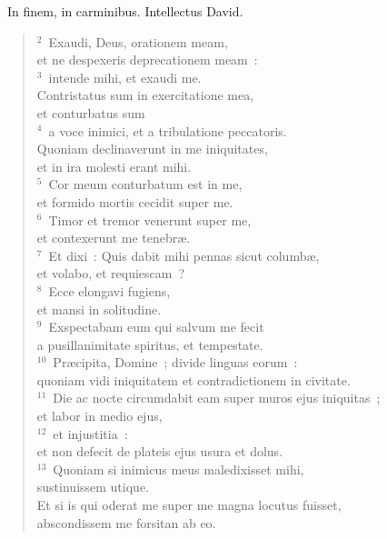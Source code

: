 ~\lettrine[lines=10,image=true,loversize=0.05,lraise=-0.03]{I}{}n finem, in carminibus. Intellectus David.
\begin{flushleft}\begin{verse}\vspace{6pt}${}^{2}$~Exaudi, Deus, orationem meam,\\ et ne despexeris deprecationem meam~:\\
${}^{3}$~intende mihi, et exaudi me.\\ Contristatus sum in exercitatione mea,\\ et conturbatus sum\\
${}^{4}$~a voce inimici, et a tribulatione peccatoris.\\ Quoniam declinaverunt in me iniquitates,\\ et in ira molesti erant mihi.\\
${}^{5}$~Cor meum conturbatum est in me,\\ et formido mortis cecidit super me.\\
${}^{6}$~Timor et tremor venerunt super me,\\ et contexerunt me tenebr\ae .\\
${}^{7}$~Et dixi~: Quis dabit mihi pennas sicut columb\ae ,\\ et volabo, et requiescam~?\\
${}^{8}$~Ecce elongavi fugiens,\\ et mansi in solitudine.\\
${}^{9}$~Exspectabam eum qui salvum me fecit\\ a pusillanimitate spiritus, et tempestate.\\
${}^{10}$~Pr\ae cipita, Domine~; divide linguas eorum~:\\ quoniam vidi iniquitatem et contradictionem in civitate.\\
${}^{11}$~Die ac nocte circumdabit eam super muros ejus iniquitas~;\\ et labor in medio ejus,\\
${}^{12}$~et injustitia~:\\ et non defecit de plateis ejus usura et dolus.\\
${}^{13}$~Quoniam si inimicus meus maledixisset mihi,\\ sustinuissem utique.\\ Et si is qui oderat me super me magna locutus fuisset,\\ abscondissem me forsitan ab eo.\\

\end{verse}
\end{flushleft}
